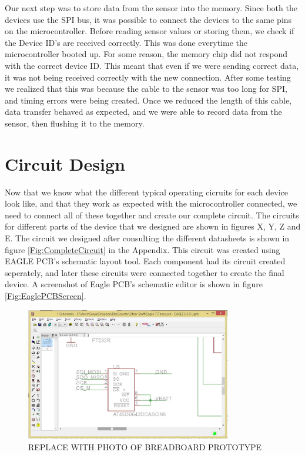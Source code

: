 Our next step was to store data from the sensor into the memory.
Since both the devices use the SPI bus,
it was possible to connect the devices to the same pins on the microcontroller.
Before reading sensor values or storing them,
we check if the Device ID's are received correctly.
This was done everytime the microcontroller booted up.
For some reason, the memory chip did not respond with the correct device ID.
This meant that even if we were sending correct data,
it was not being received correctly with the new connection.
After some testing we realized that this was because the cable to the sensor was too long for SPI,
and timing errors were being created.
Once we reduced the length of this cable,
data transfer behaved as expected,
and we were able to record data from the sensor,
then flushing it to the memory.

\section{Circuit Design}
\label{Sec:CircuitDesign}
Now that we know what the different typical operating cicruits for each device look like,
and that they work as expected with the microcontroller connected,
we need to connect all of these together and create our complete circuit.
The circuits for different parts of the device that we designed are shown in figures X, Y, Z and E.
The circuit we designed after consulting the different datasheets is shown in figure \ref{Fig:CompleteCircuit} in the Appendix.
This circuit was created using EAGLE PCB's schematic layout tool.
Each component had its circuit created seperately,
and later these circuits were connected together to create the final device.
A screenshot of Eagle PCB's schematic editor is shown in figure \ref{Fig:EaglePCBScreen}.
\begin{figure}
\begin{center}
\includegraphics[width=0.8\textwidth]{images/EagleScreen.jpg}
\caption{REPLACE WITH PHOTO OF BREADBOARD PROTOTYPE}
\label{Fig:BreadBoardProto}
\end{center}
\end{figure}

